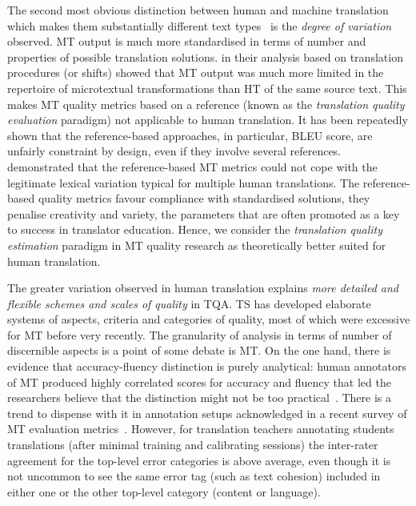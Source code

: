 The second most obvious distinction between human and machine translation which makes them substantially different text types~\cite[according to][]{Specia2018a} is the \textit{degree of variation} observed. MT output is much more standardised in terms of number and properties of possible translation solutions. \citet{Ahrenberg2017} in their analysis based on translation procedures (or shifts) showed that MT output was much more limited in the repertoire of microtextual transformations than HT of the same source text.
This makes MT quality metrics based on a reference (known as the \textit{translation quality evaluation} paradigm) not applicable to human translation. It has been repeatedly shown that the reference-based approaches, in particular, BLEU score, are unfairly constraint by design, even if they involve several references. \citet{Vela2014} demonstrated that the reference-based MT metrics could not cope with the legitimate lexical variation typical for multiple human translations. The reference-based quality metrics favour compliance with standardised solutions, they penalise creativity and variety, the parameters that are often promoted as a key to success in translator education. Hence, we consider the \textit{translation quality estimation} paradigm in MT quality research as theoretically better suited for human translation.

The greater variation observed in human translation explains \textit{more detailed and flexible schemes and scales of quality} in TQA. TS has developed elaborate systems of aspects, criteria and categories of quality, most of which were excessive for MT before very recently. 
The granularity of analysis in terms of number of discernible aspects is a point of some debate is MT. On the one hand, there is evidence that accuracy-fluency distinction is purely analytical: human annotators of MT produced highly correlated scores for accuracy and fluency that led the researchers believe that the distinction might not be too practical~\cite{CallisonBurch2007}. There is a trend to dispense with it in annotation setups acknowledged in a recent survey of MT evaluation metrics~\cite{Chatzikoumi2020}.
However, for translation teachers annotating students translations (after minimal training and calibrating sessions) the inter-rater agreement for the top-level error categories is above average, even though it is not uncommon to see the same error tag (such as text cohesion) included in either one or the other top-level category (content or language).

